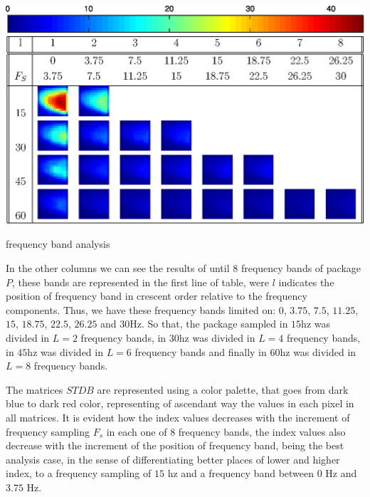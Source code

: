 \documentclass[review]{elsarticle}
\begin{document}
\begin{table}[h!]
\includegraphics[width=\textwidth]{colorbar.eps}
\includegraphics[width=\textwidth]{freq1.eps}
\caption{frequency band analysis}
\label{table:2}
\end{table}
In the other columns we can see the results of until $8$ frequency bands of package $P$,
these bands are represented in the first line of table, were $l$ indicates the position of frequency band
in crescent order relative to the frequency components. Thus, we have 
these frequency bands limited on: $0$, $3.75$, $7.5$, $11.25$, $15$, $18.75$, $22.5$, $26.25$ and $30$Hz.
So that, the package sampled in $15$hz was divided in $L=2$ frequency bands, 
in $30$hz was divided in $L=4$ frequency bands, 
in $45$hz was divided in $L=6$ frequency bands and finally
in $60$hz was divided in $L=8$ frequency bands.

The matrices $STDB$ are represented using a color palette, 
that goes from dark blue to dark red color, representing of ascendant way the values
in each pixel in all matrices. It is evident how the index values decreases with
the increment of frequency sampling $F_s$ in each one of 8 frequency bands, 
the index values also decrease with the increment of the position of frequency band,
being the best analysis case, 
in the sense of differentiating better places of lower and higher index, 
to a frequency sampling of $15$ hz and a frequency band between $0$ Hz and $3.75$ Hz. 




\end{document}
